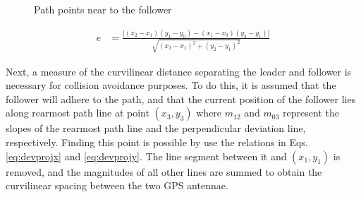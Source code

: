 \documentclass[12pt]{report}
\begin{document}
\begin{figure}[ht] \centering \label{fig:pathpts}
\caption{Path points near to the follower}
\end{figure}


\begin{align} \label{eq:laterr}
    e &= \frac{ | (x_2 - x_1)(y_1 - y_0) - (x_1 - x_0)(y_2 - y_1) | } { \sqrt{ (x_2 - x_1)^2 + (y_2 - y_1)^2 } }
\end{align}

Next, a measure of the curvilinear distance separating the leader and follower is necessary for collision avoidance purposes. To do this, it is assumed that the follower will adhere to the path, and that the current position of the follower lies along rearmost path line at point $(x_3, y_3)$ where $m_{12}$ and $m_{03}$ represent the slopes of the rearmost path line and the perpendicular deviation line, respectively. Finding this point is possible by use the relations in Eqs. \ref{eq:devprojx} and \ref{eq:devprojy}. The line segment between it and $(x_1,y_1)$ is removed, and the magnitudes of all other lines are summed to obtain the curvilinear spacing between the two GPS antennae. 
\end{document}
